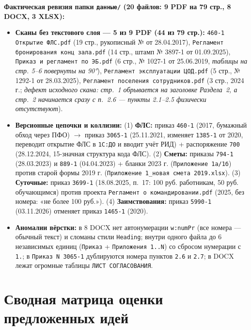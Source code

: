 \documentclass[10pt,a4paper]{article}
\begin{document}
\textbf{Фактическая ревизия папки \texttt{данные/} (20 файлов: 9 PDF на 79 стр., 8 DOCX, 3 XLSX):}
\begin{itemize}
    \item \textbf{Сканы без текстового слоя — 5 из 9 PDF (44 из 79 стр.):} \texttt{460-1 Открытие ФЛС.pdf} (19 стр., рукописный № от 28.04.2017), \texttt{Регламент бронирования конц зала.pdf} (14 стр., штамп № 3897-1 от 01.09.2025), \texttt{Приказ и регламент по ЭБ.pdf} (6 стр., № 1027-1 от 25.06.2019, \emph{таблицы на стр. 5--6 повернуты на 90°}), \texttt{Регламент эксплуатации ЦОД.pdf} (5 стр., № 1292-1 от 28.03.2025), \texttt{Регламент поселения сотрудников.pdf} (3 стр., 2024 г.; \emph{дефект исходного скана: стр.~1 обрывается на заголовке Раздела~2, а стр.~2 начинается сразу с п.~2.6 — пункты 2.1--2.5 физически отсутствуют}).
    \item \textbf{Версионные цепочки и коллизии:} (1) \textbf{ФЛС:} приказ \texttt{460-1} (2017, бумажный обход через ПФО) $\to$ приказ \texttt{3065-1} (25.11.2021, изменяет \texttt{1385-1} от 2020, переводит открытие ФЛС в \texttt{1С:ДО} и вводит учёт РИД) + распоряжение \texttt{700} (28.12.2024, 15-значная структура кода ФЛС). (2) \textbf{Сметы:} приказы \texttt{794-1} (28.03.2023) и \texttt{889-1} (04.04.2023) + бланки 2023 г. (\texttt{Приложение 1а/1б}) против старой формы 2019 г. (\texttt{Приложение 1\_новая смета 2019.xlsx}). (3) \textbf{Суточные:} приказ \texttt{3699-1} (18.08.2025, п.~17: 100 руб. работникам, 50 руб. обучающимся) против проекта \texttt{Регламент о командировании.pdf} (2025, без номера: «не более 100 руб.»). (4) \textbf{Заимствования:} приказ \texttt{5990-1} (03.11.2026) отменяет приказ \texttt{1465-1} (2020).
    \item \textbf{Аномалии вёрстки:} в 8 DOCX нет автонумерации \texttt{w:numPr} (все номера — обычный текст) и сломаны стили \texttt{Heading}; внутри одного файла до 6 независимых единиц (\texttt{Приказ} + \texttt{Приложения 1..N}) со сбросом нумерации с \texttt{1.}; в \texttt{Приказ N 3065-1} дублируются номера пунктов \texttt{2.6} и \texttt{2.7}; в DOCX лежат огромные таблицы \texttt{ЛИСТ СОГЛАСОВАНИЯ}.
\end{itemize}

\section{Сводная матрица оценки предложенных идей}
\end{document}
